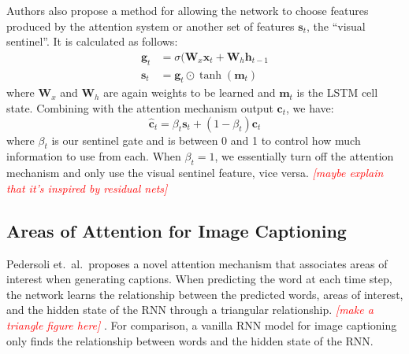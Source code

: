 \documentclass[10pt,twocolumn,letterpaper]{article}
\newcommand{\todo}[1]{\textcolor{red}{{\em [#1]}} }
\newcommand{\bfit}[1]{\boldsymbol{#1}}
\newcommand{\bs}[1]{\boldsymbol{#1}}
\begin{document}
Authors also propose a method for allowing the network to choose features
produced by the attention system or another set of features
$\bs{s}_t$, the ``visual sentinel''. It is calculated as follows:
%
\begin{align}
  \bs{g}_t &= \sigma (\bfit{W}_x \bs{x}_t + \bfit{W}_h \bs{h}_{t-1} \\
  \bs{s}_t &= \bs{g}_t \odot \tanh (\bs{m}_t)
\end{align}
%
where $\bfit{W}_x$ and $\bfit{W}_h$ are again weights to be learned and
$\bs{m}_t$ is the LSTM cell state. Combining with the attention
mechanism output $\bs{c}_t$, we have:
%
\begin{equation}
  \hat{\bs{c}}_t = \beta_t \bs{s}_t + (1 - \beta_t) \bs{c}_t
\end{equation}
%
where $\beta_t$ is our sentinel gate and is between 0 and 1 to control how
much information to use from each. When $\beta_t=1$, we essentially turn
off the attention mechanism and only use the visual sentinel feature, vice
versa. \todo{maybe explain that it's inspired by residual nets}

\subsection{Areas of Attention for Image Captioning}

Pedersoli et.\ al.\ proposes a novel attention mechanism that associates
areas of interest when generating captions. When predicting the word at each
time step, the network learns the relationship between the predicted words,
areas of interest, and the hidden state of the RNN through a triangular
relationship. \todo{make a triangle figure here}. For comparison, a vanilla
RNN model for image captioning only finds the relationship between words and
the hidden state of the RNN.
\end{document}
